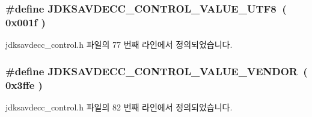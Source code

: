 \subsubsection[{\texorpdfstring{J\+D\+K\+S\+A\+V\+D\+E\+C\+C\+\_\+\+C\+O\+N\+T\+R\+O\+L\+\_\+\+V\+A\+L\+U\+E\+\_\+\+U\+T\+F8}{JDKSAVDECC_CONTROL_VALUE_UTF8}}]{\setlength{\rightskip}{0pt plus 5cm}\#define J\+D\+K\+S\+A\+V\+D\+E\+C\+C\+\_\+\+C\+O\+N\+T\+R\+O\+L\+\_\+\+V\+A\+L\+U\+E\+\_\+\+U\+T\+F8~( 0x001f )}\hypertarget{group__aem__control__value_ga42ad0a13c28e2da03c3b8a1dbe523eeb}{}\label{group__aem__control__value_ga42ad0a13c28e2da03c3b8a1dbe523eeb}


jdksavdecc\+\_\+control.\+h 파일의 77 번째 라인에서 정의되었습니다.

\subsubsection[{\texorpdfstring{J\+D\+K\+S\+A\+V\+D\+E\+C\+C\+\_\+\+C\+O\+N\+T\+R\+O\+L\+\_\+\+V\+A\+L\+U\+E\+\_\+\+V\+E\+N\+D\+OR}{JDKSAVDECC_CONTROL_VALUE_VENDOR}}]{\setlength{\rightskip}{0pt plus 5cm}\#define J\+D\+K\+S\+A\+V\+D\+E\+C\+C\+\_\+\+C\+O\+N\+T\+R\+O\+L\+\_\+\+V\+A\+L\+U\+E\+\_\+\+V\+E\+N\+D\+OR~( 0x3ffe )}\hypertarget{group__aem__control__value_ga0fd74363ed131dd080e0fcc73c8384f5}{}\label{group__aem__control__value_ga0fd74363ed131dd080e0fcc73c8384f5}


jdksavdecc\+\_\+control.\+h 파일의 82 번째 라인에서 정의되었습니다.


